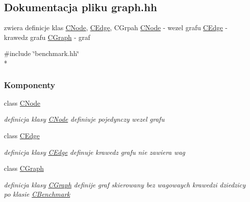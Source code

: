 \hypertarget{graph_8hh}{}\subsection{Dokumentacja pliku graph.\+hh}
\label{graph_8hh}


zwiera definicje klas \hyperlink{class_c_node}{C\+Node}, \hyperlink{class_c_edge}{C\+Edge}, C\+Grpah \hyperlink{class_c_node}{C\+Node} -\/ wezel grafu \hyperlink{class_c_edge}{C\+Edge} -\/ krawedz grafu \hyperlink{class_c_graph}{C\+Graph} -\/ graf  


{\ttfamily \#include \char`\"{}benchmark.\+hh\char`\"{}}\\*
\subsubsection*{Komponenty}
\begin{DoxyCompactItemize}
\item 
class \hyperlink{class_c_node}{C\+Node}
\begin{DoxyCompactList}\small\item\em definicja klasy \hyperlink{class_c_node}{C\+Node} definiuje pojedynczy wezel grafu \end{DoxyCompactList}\item 
class \hyperlink{class_c_edge}{C\+Edge}
\begin{DoxyCompactList}\small\item\em definicja klasy \hyperlink{class_c_edge}{C\+Edge} definuje krawedz grafu nie zawiera wag \end{DoxyCompactList}\item 
class \hyperlink{class_c_graph}{C\+Graph}
\begin{DoxyCompactList}\small\item\em definicja klasy \hyperlink{class_c_graph}{C\+Graph} definije graf skierowany bez wagowaych krawedzi dziedzicy po klasie \hyperlink{class_c_benchmark}{C\+Benchmark} \end{DoxyCompactList}\end{DoxyCompactItemize}
